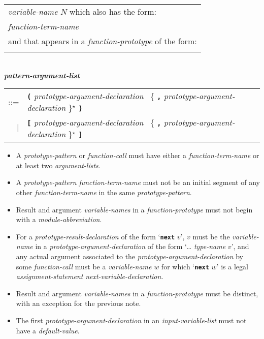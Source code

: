 \documentclass[12pt]{article}
\newcommand{\TT}[1]{{\tt \bfseries #1}}
\newcommand{\STAR}{{\Large $^\star$}}
\newcommand{\QMARK}{{$^{\,\mbox{\footnotesize ?}}$}}
\newcommand{\emkey}[1]{{\em \bfseries #1}}
\newenvironment{indpar}[1][0.3in]%
	{\begin{list}{}%
		     {\setlength{\itemsep}{0in}%
		      \setlength{\topsep}{0in}%
		      \setlength{\parsep}{1ex}%
		      \setlength{\labelwidth}{#1}%
		      \setlength{\leftmargin}{#1}%
		      \addtolength{\leftmargin}{\labelsep}}%
	 \item}%
	{\end{list}}
\begin{document}
\begin{indpar}[0.1in]
\begin{tabular}[t]{@{}p{5in}@{}}
    {\em variable-name} $N$ which also has the form: \\
    \hspace*{1in}{\em module-abbreviation}\QMARK{} {\em function-term-name} \\
    and that appears in a {\em function-prototype} of the form: \\
    \hspace*{1in}{\tt function $N$ = \ldots}
    \end{tabular}
\\[0.5ex]
\emkey{pattern-argument-list}\label{PATTERN-ARGUMENT-LIST} \\
\hspace*{0.5in}
    \begin{tabular}[t]{@{}rl}
    ::= & \TT{(} {\em prototype-argument-declaration}~
	     \{ \TT{,} {\em prototype-argument-declaration} \}\STAR{} \TT{)} \\
    $|$ & \TT{[} {\em prototype-argument-declaration}~
	     \{ \TT{,} {\em prototype-argument-declaration} \}\STAR{} \TT{]} \\
    \end{tabular}
\begin{itemize}
\item
A {\em prototype-pattern} or {\em function-call}
must have either a {\em function-term-name}
or at least two {\em argu\-ment-lists}.
\item
A {\em prototype-pattern} {\em function-term-name} must not be
an initial segment of any other {\em function-term-name}
in the same {\em prototype-pattern}.
\item
Result and argument {\em variable-names}
in a {\em function-prototype} must not begin with a {\em module-abbreviation}.
\item
\label{PROTOTYPE-NEXT-RESULT}
For a {\em prototype-result-declaration} of the form `\TT{next} $v$',
$v$ must be the {\em vari\-able-name} in a {\em prototype-argument-declaration}
of the form `\dots{} {\em type-name} $v$', and
any actual argument associated to the {\em prototype-argument-declaration}
by some {\em function-call}
must be a {\em variable-name} $w$ for which `\TT{next} $w$' is a legal
{\em assignment-statement} {\em next-variable-declaration}.
\item
Result and argument {\em variable-names}
in a {\em function-prototype} must
be distinct, with an exception for the previous note.
\item
The first {\em prototype-argument-declaration} in an {\em input-variable-list}
must not have a {\em default-value}.

\end{itemize}
\end{indpar}
\end{document}
